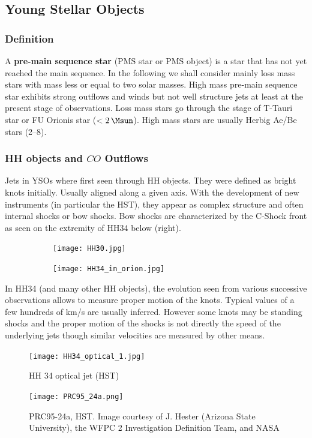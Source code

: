 \documentclass[10pt,a4paper,english]{article}
\begin{document}
\subsection{Young Stellar Objects}

\subsubsection{Definition}

A \textbf{pre-main sequence star} (PMS star or PMS object) is a star that has
not yet reached the main sequence. In the following we shall consider mainly
loss mass stars with mass less or equal to two solar masses. High mass pre-main
sequence star exhibits strong outflows and winds but not well structure jets at
least at the present stage of observations. Loss mass stars go through the
stage of T-Tauri star or FU Orionis star ($<\SI{2}{\Msun}$). High mass stars
are usually Herbig Ae/Be stars (\SIrange{2}{8}{\Msun}).

\subsubsection{\texorpdfstring{HH objects and $CO$ Outflows}{HH objects and CO Outflows}}

Jets in YSOs where first seen through HH objects. They were defined as bright
knots initially. Usually aligned along a given axis. With the development of
new instruments (in particular the HST), they appear as complex structure and
often internal shocks or bow shocks. Bow shocks are characterized by the
C-Shock front as seen on the extremity of HH34 below (right).

\begin{figure}[!ht]
  \begin{subfigure}[t]{0.495\textwidth}
    \texttt{[image: HH30.jpg]}
  \end{subfigure}
  \begin{subfigure}[t]{0.495\textwidth}
    \texttt{[image: HH34\_in\_orion.jpg]}
  \end{subfigure}
\end{figure}

In HH34 (and many other HH objects), the evolution seen from various successive
observations allows to measure proper motion of the knots. Typical values of a
few hundreds of km/s are usually inferred. However some knots may be standing
shocks and the proper motion of the shocks is not directly the speed of the
underlying jets though similar velocities are measured by other means.
\begin{figure}[!ht]
  \centering
  \texttt{[image: HH34\_optical\_1.jpg]}
  \caption{HH 34 optical jet (HST)}
\end{figure}
\begin{figure}[!ht]
  \centering
  \texttt{[image: PRC95\_24a.png]}
  \caption{PRC95-24a, HST. Image courtesy of J. Hester (Arizona State University), the WFPC 2 Investigation Definition Team, and NASA}
\end{figure}
\end{document}
